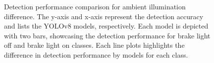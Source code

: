 \begin{figure}[b!]%

    \hfill

\caption{Detection performance comparison for ambient illumination difference. The y-axis and x-axis represent the detection accuracy and lists the YOLOv8 models, respectively. Each model is depicted with two bars, showcasing the detection performance for brake light off and brake light on classes. Each line plots highlights the difference in detection performance by models for each class.}
\label{fig:dayNnight}%
\end{figure}

